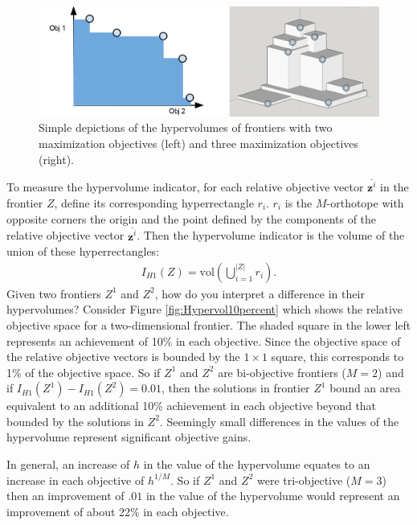 \begin{figure}[ht]
\centering
\includegraphics[width=.85\textwidth]{../images/FrontierVolumesConvexNo2DOutlines}
\caption[Hypervolume of Pareto frontiers]{Simple depictions of the hypervolumes of frontiers with two maximization objectives (left) and three maximization objectives (right).}
\label{fig:frontierVolumes}
\end{figure}

To measure the hypervolume indicator, for each relative objective vector $\overbar{\mathbf{z}^i}$ in the frontier $Z$, define its corresponding hyperrectangle $r_i$. $r_i$ is the $M$-orthotope with opposite corners the origin and the point defined by the components of the relative objective vector $\overbar{\mathbf{z}^i}$. Then the hypervolume indicator is the volume of the union of these hyperrectangles:
\begin{align}
I_{H1}(Z) = \text{vol} \left( \bigcup_{i = 1}^{|Z|} r_i \right). \label{eqn:hypervol}
\end{align}
Given two frontiers $Z^1$ and $Z^2$, how do you interpret a difference in their hypervolumes? Consider Figure \ref{fig:Hypervol10percent} which shows the relative objective space for a two-dimensional frontier. The shaded square in the lower left represents an achievement of 10\% in each objective. Since the objective space of the relative objective vectors is bounded by the $1 \times 1$ square, this corresponds to 1\% of the objective space. So if $Z^1$ and $Z^2$ are bi-objective frontiers ($M=2$) and if $I_{H1}(Z^1) - I_{H1}(Z^2) = 0.01$, then the solutions in frontier $Z^1$ bound an area equivalent to an additional 10\% achievement in each objective beyond that bounded by the solutions in $Z^2$. Seemingly small differences in the values of the hypervolume represent significant objective gains.

In general, an increase of $h$ in the value of the hypervolume equates to an increase in each objective of $h^{1/M}$. So if $Z^1$ and $Z^2$ were tri-objective ($M=3$) then an improvement of $.01$ in the value of the hypervolume would represent an improvement of about 22\% in each objective.

